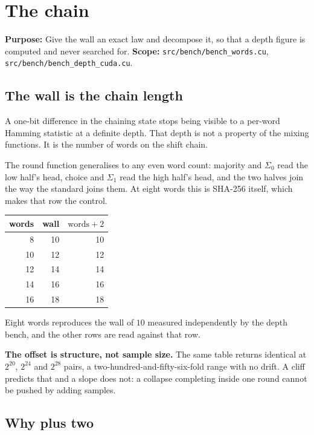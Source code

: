 \chapter{The chain}

\textbf{Purpose:} Give the wall an exact law and decompose it, so that a depth figure is computed and never searched for. \textbf{Scope:} \texttt{src/\allowbreak{}bench/\allowbreak{}bench\_\allowbreak{}words.\allowbreak{}cu}, \texttt{src/\allowbreak{}bench/\allowbreak{}bench\_\allowbreak{}depth\_\allowbreak{}cuda.\allowbreak{}cu}.

\section{The wall is the chain length}

A one-bit difference in the chaining state stops being visible to a per-word Hamming statistic at a definite depth. That depth is not a property of the mixing functions. It is the number of words on the shift chain.

The round function generalises to any even word count: majority and \(\Sigma_0\) read the low half's head, choice and \(\Sigma_1\) read the high half's head, and the two halves join the way the standard joins them. At eight words this is SHA-256 itself, which makes that row the control.

\begin{center}
\begin{tabular}{rrr}
\toprule
words & wall & \(\text{words} + 2\) \\
\midrule
8 & 10 & 10 \\
10 & 12 & 12 \\
12 & 14 & 14 \\
14 & 16 & 16 \\
16 & 18 & 18 \\
\bottomrule
\end{tabular}
\end{center}

Eight words reproduces the wall of \(10\) measured independently by the depth bench, and the other rows are read against that row.

\textbf{The offset is structure, not sample size.} The same table returns identical at \(2^{20}\), \(2^{24}\) and \(2^{28}\) pairs, a two-hundred-and-fifty-six-fold range with no drift. A cliff predicts that and a slope does not: a collapse completing inside one round cannot be pushed by adding samples.

\section{Why plus two}

